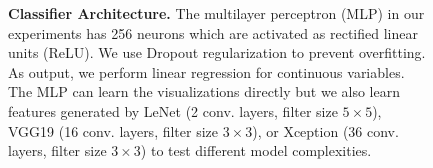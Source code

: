\begin{figure}[t]
	\centering
	
	\hfill

  \caption{\textbf{Classifier Architecture.} The multilayer perceptron (MLP) in our experiments has 256 neurons which are activated as rectified linear units (ReLU). We use Dropout regularization to prevent overfitting. As output, we perform linear regression for continuous variables. The MLP can learn the visualizations directly but we also learn features generated by LeNet (2 conv. layers, filter size $5\times5$), VGG19 (16 conv. layers, filter size $3\times3$), or Xception (36 conv. layers, filter size $3\times3$) to test different model complexities.}
	\label{fig:classifiers}
\end{figure}

